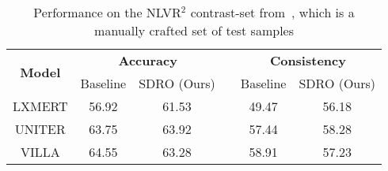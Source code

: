 \begin{table}
    \centering
    \begin{tabular}{c cc c cc}
        \toprule
        \multirow{2}{*}{\textbf{Model}} & \multicolumn{2}{c}{\textbf{Accuracy}} & \hphantom &  \multicolumn{2}{c}{\textbf{Consistency}} \\
        \cmidrule{2-3} \cmidrule{5-6}
            & Baseline & SDRO (Ours) && Baseline & SDRO (Ours) \\
                
        \midrule 
        LXMERT & 56.92 & 61.53 && 49.47 & 56.18 \\
        UNITER & 63.75 & 63.92 && 57.44 & 58.28 \\
        VILLA  & 64.55 & 63.28 && 58.91 & 57.23 \\
        \bottomrule
    \end{tabular}
    \caption{Performance on the NLVR$^2$ contrast-set from~\cite{gardner2020evaluating}, which is a manually crafted set of test samples }
    \label{tab:contrast_sets}
\end{table}